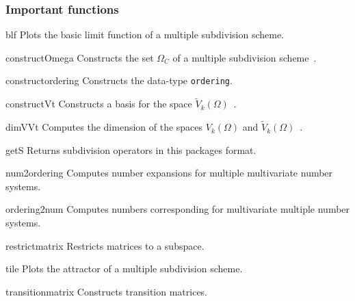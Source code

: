 \subsubsection*{Important functions}
\begin{param}
\item[blf] Plots the basic limit function of a multiple subdivision scheme.
\item[constructOmega] Constructs the set $\Omega_C$ of a multiple subdivision scheme~\cite{CM18}.    
\item[constructordering] Constructs the data-type \texttt{ordering}.
\item[constructVt] Constructs a basis for the space $\tilde{V}_k(\Omega)$~\cite{CM18}.
\item[dimVVt] Computes the dimension of the spaces $V_k(\Omega)$ and $\tilde{V}_k(\Omega)$~\cite{CM18}.
\item[getS] Returns subdivision operators in this packages format.
\item[num2ordering] Computes number expansions for multiple multivariate number systems.
\item[ordering2num] Computes numbers corresponding for multivariate multiple number systems.
\item[restrictmatrix] Restricts matrices to a subspace.
\item[tile] Plots the attractor of a multiple subdivision scheme.
\item[transitionmatrix] Constructs transition matrices.
\end{param}

